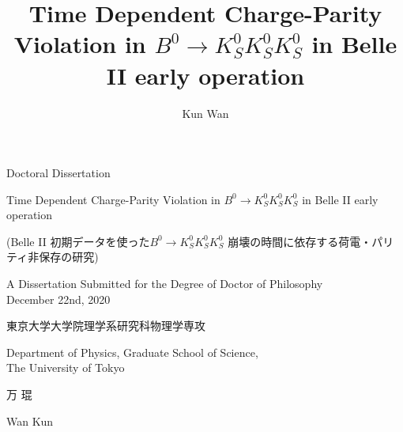 \begin{center}
\large
Doctoral Dissertation
\vspace{0.6cm}

Time Dependent Charge-Parity Violation in $B^0 \to K^0_S K^0_S K^0_S $ in Belle II early operation\\
\end{center}
\begin{CJK}{UTF8}{min}
	\large
	\centering
	(Belle II 初期データを使った$B^0 \to K_S^0  K_S^0  K_S^0$ 崩壊の時間に依存する荷電・パリティ非保存の研究)\\
	\vspace{1cm}
\end{CJK}
\begin{CJK}{UTF8}{min}
	\large
\end{CJK}
\begin{center}
	\large
A Dissertation Submitted for the Degree of Doctor of Philosophy
\\
December 22nd,
2020
\vspace{1cm}
\end{center}
\begin{CJK}{UTF8}{min}
	\large
	\centering
東京大学大学院理学系研究科物理学専攻\\
\end{CJK}
\begin{center}
	\large
	Department of Physics, Graduate School of Science,
\\
	The University of Tokyo
	\vspace{0.6cm}
\end{center}

\begin{CJK}{UTF8}{min}
	\large
	\centering
	万 琨\\
\end{CJK}
\begin{center}
	\large
	Wan Kun 
\end{center}


\title{Time Dependent Charge-Parity Violation in $B^0 \to K^0_S K^0_S K^0_S $ in Belle II early operation}

\author{Kun Wan}

